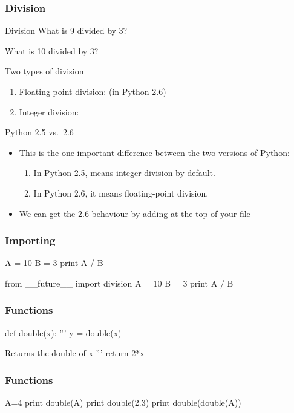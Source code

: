 \begin{frame}[fragile]
\frametitle{Division}
\begin{block}{Division}
What is 9 divided by 3?

What is 10 divided by 3?
\end{block}

\begin{block}{Two types of division}
\begin{enumerate}
\item Floating-point division:  (in Python 2.6)
\item Integer division: 
\end{enumerate}
\end{block}

\begin{block}{Python 2.5 vs.\ 2.6}
\begin{itemize}
\item This is the one important difference between the two versions of Python:
\begin{enumerate}
\item In Python 2.5,  means \alert{integer division} by default.
\item In Python 2.6, it means \alert{floating-point division}.
\end{enumerate}
\item We can get the 2.6 behaviour by adding  at the top of your file
\end{itemize}
\end{block}
\end{frame}

\begin{frame}[fragile]
\frametitle{Importing}

\begin{python}
A = 10
B = 3
print A / B
\end{python}

\begin{python}
from __future__ import division
A = 10
B = 3
print A / B
\end{python}
\end{frame}


\begin{frame}[fragile]
\frametitle{Functions}
\begin{python}
def double(x):
    '''
    y = double(x)

    Returns the double of x
    '''
    return 2*x
\end{python}
\end{frame}

\begin{frame}[fragile]
\frametitle{Functions}
\begin{python}
A=4
print double(A)
print double(2.3)
print double(double(A))
\end{python}
\end{frame}



